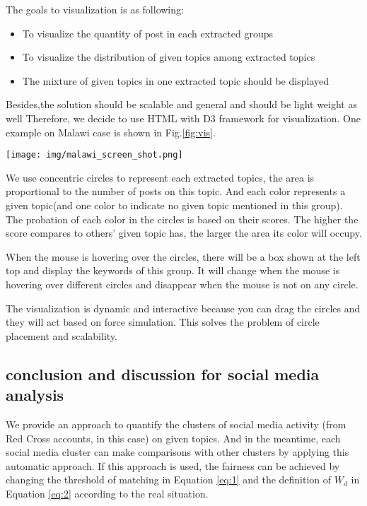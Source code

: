 \documentclass[sigchi]{acmart}
\begin{document}
The goals to visualization is as following:
\begin{itemize}
    \item To visualize the quantity of post in each extracted groups
    \item To visualize the distribution of given topics among extracted topics
    \item The mixture of given topics in one extracted topic should be displayed
\end{itemize}

Besides,the solution should be scalable and general and should be light weight as well
Therefore, we decide to use HTML with D3 framework for visualization. One example on Malawi case is shown in Fig.\ref{fig:vis}.
\begin{figure*}
    \centering
    \texttt{[image: img/malawi\_screen\_shot.png]}
    \caption{Visualization on Malawi social media posts }
    \label{fig:vis}
\end{figure*}
We use concentric circles to represent each extracted topics, the area is proportional to the number of posts on this topic. And each color represents a given topic(and one color to indicate no given topic mentioned in this group). The probation of each color in the circles is based on their scores. The higher the score compares to others' given topic has, the larger the area its color will occupy.

When the mouse is hovering over the circles, there will be a box shown at the left top and display the keywords of this group. It will change when the mouse is hovering over different circles and disappear when the mouse is not on any circle.

The visualization is dynamic and interactive because you can drag the circles and they will act based on force simulation. This solves the problem of circle placement and scalability.

\subsection{conclusion and discussion for social media analysis}

We provide an approach to quantify the clusters of social media activity (from Red Cross accounts, in this case) on given topics. And in the meantime, each social media cluster can make comparisons with other clusters by applying this automatic approach. If this approach is used, the fairness can be achieved by changing the threshold of matching in Equation \ref{eq:1} and the definition of $W_{d}$ in Equation \ref{eq:2} according to the real situation.
\end{document}

